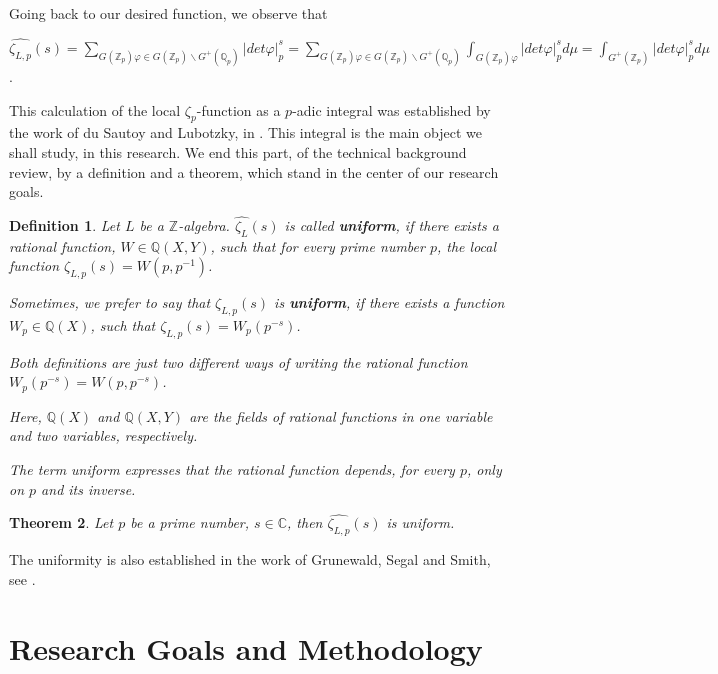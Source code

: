 \documentclass[12pt]{article}
\newtheorem{theorem}{Theorem}[subsection]
\newtheorem{definition}[theorem]{Definition}
\begin{document}
Going back to our desired function, we observe that\par $\hat{\zeta_{L,p}}(s)=\underset{\scriptscriptstyle G(\mathbb{Z}_p)\varphi\in G(\mathbb{Z}_p)\backslash G^+(\mathbb{Q}_p)}{\sum}|det\varphi|_p^s=\underset{\scriptscriptstyle G(\mathbb{Z}_p)\varphi\in G(\mathbb{Z}_p)\backslash G^+(\mathbb{Q}_p)}{\sum}\displaystyle\int_{G(\mathbb{Z}_p)\varphi}|det\varphi|_p^sd\mu=\displaystyle\int_{G^{+}(\mathbb{Z}_p)}|det\varphi|_p^sd\mu$.\par 
This calculation of the local $\zeta_p$-function as a $p$-adic integral was established by the work of du Sautoy and Lubotzky, in \cite{DuSautoyLubotzky}.
This integral is the main object we shall study, in this research.
We end this part, of the technical background review, by a definition and a theorem, which stand in the center of our research goals.
\begin{definition}
Let $L$ be a $\mathbb{Z}$-algebra. $\hat{\zeta_L}(s)$ is called \textbf{uniform}, if there exists a rational function, $W\in\mathbb{Q}(X,Y)$, such that for every prime number $p$, the local function $\zeta_{L,p}(s)=W(p,p^{-1})$.\par 
Sometimes, we prefer to say that $\zeta_{L,p}(s)$ is \textbf{uniform}, if there exists a function $W_p\in\mathbb{Q}(X)$, such that $\zeta_{L,p}(s)=W_p(p^{-s})$.\par
Both definitions are just two different ways of writing the rational function $W_p(p^{-s})=W(p,p^{-s})$.\par
Here, $\mathbb{Q}(X)$ and $\mathbb{Q}(X,Y)$ are the fields of rational functions in one variable and two variables, respectively.\par
The term uniform expresses that the rational function depends, for every $p$, only on $p$ and its inverse.\par
\end{definition}
\begin{theorem}
\label{thm.rational.function}
Let $p$ be a prime number, $s\in\mathbb{C}$, then $\hat{\zeta_{L,p}}(s)$ is uniform. 
\end{theorem}
The uniformity is also established in the work of Grunewald, Segal and Smith, see \cite{GrunewaldSegalSmith}.
\section{Research Goals and Methodology}
\end{document}
